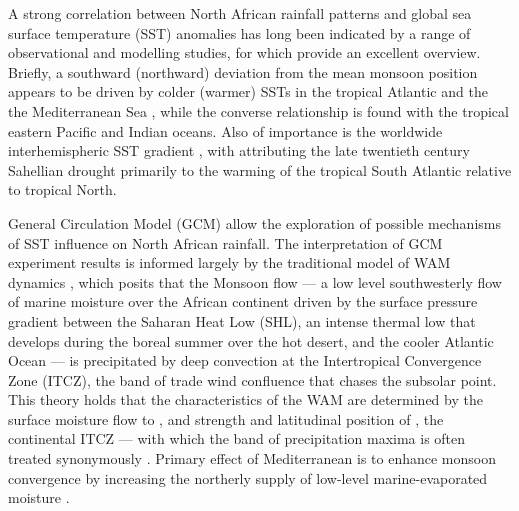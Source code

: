 \documentclass[a4paper]{article}
\begin{document}
A strong correlation between North African rainfall patterns and global sea surface temperature (SST) anomalies has long been indicated by a range of observational and modelling studies, for which \citeauthor{rodriguez2015variability} \parencite{rodriguez2015variability} provide an excellent overview. %
Briefly, a southward (northward) deviation from the mean monsoon position appears to be driven by colder (warmer) SSTs in the tropical Atlantic \parencite{lamb1978case, lamb1978large, janowiak1988investigation, ward1998diagnosis} and the the Mediterranean Sea \parencite{rowell2003impact, gaetani2010influence, fontaine2010impacts}, while the converse relationship is found with the tropical eastern Pacific \parencite{rowell2001teleconnections, janicot2001summer, giannini2003oceanic} and Indian \parencite{bader2003impact, giannini2003oceanic} oceans.
Also of importance is the worldwide interhemispheric SST gradient \parencite{folland1986sahel}, with \citeauthor{hoerling2006detection} \parencite{hoerling2006detection} attributing the late twentieth century Sahellian drought primarily to the warming of the tropical South Atlantic relative to tropical North. 

General Circulation Model (GCM) allow the exploration of possible mechanisms of SST influence on North African rainfall.
The interpretation of GCM experiment results is informed largely by the traditional model of WAM dynamics \parencite[see][for comprehensive descriptions]{sultan2000abrupt, sultan2003west2, ramel2006northward}, which posits that the Monsoon flow --- a low level southwesterly flow of marine moisture over the African continent driven by the surface pressure gradient between the Saharan Heat Low (SHL), an intense thermal low that develops during the boreal summer over the hot desert, and the cooler Atlantic Ocean \parencite{hall2006dynamics, grams2010atlantic} --- is precipitated by deep convection at the Intertropical Convergence Zone (ITCZ), the band of trade wind confluence that chases the subsolar point. 
This theory holds that the characteristics of the WAM are determined by the surface moisture flow to \parencite{folland1986sahel, sultan2003west1, hagos2007dynamics}, and strength and latitudinal position of \parencite{janicot1998west, damato1998characteristics, sultan2003west1}, the continental ITCZ --- with which the band of precipitation maxima is often treated synonymously \parencite[e.g.][]{ba1995satellite, ramel2006northward, braconnot2007results, peyrille2016annual}.
Primary effect of Mediterranean is to enhance monsoon convergence by increasing the northerly supply of low-level marine-evaporated moisture \parencite{rowell2003impact, gaetani2010influence}.
\end{document}
